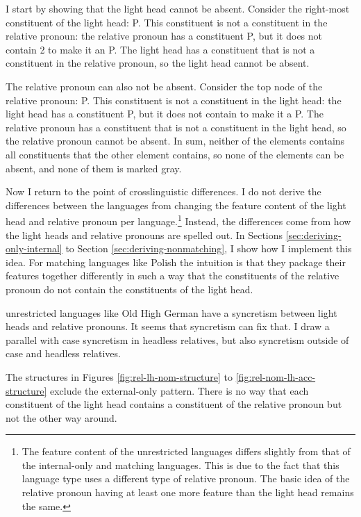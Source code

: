 I start by showing that the light head cannot be absent.
Consider the right-most constituent of the light head: P. This constituent is not a constituent in the relative pronoun: the relative pronoun has a constituent P, but it does not contain 2 to make it an P.
The light head has a constituent that is not a constituent in the relative pronoun, so the light head cannot be absent.

The relative pronoun can also not be absent.
Consider the top node of the relative pronoun: P. This constituent is not a constituent in the light head: the light head has a constituent P, but it does not contain  to make it a P.
The relative pronoun has a constituent that is not a constituent in the light head, so the relative pronoun cannot be absent.
In sum, neither of the elements contains all constituents that the other element contains, so none of the elements can be absent, and none of them is marked gray.

Now I return to the point of crosslinguistic differences.
I do not derive the differences between the languages from changing the feature content of the light head and relative pronoun per language.\footnote{
The feature content of the unrestricted languages differs slightly from that of the internal-only and matching languages. This is due to the fact that this language type uses a different type of relative pronoun. The basic idea of the relative pronoun having at least one more feature than the light head remains the same.
}
Instead, the differences come from how the light heads and relative pronouns are spelled out. In Sections \ref{sec:deriving-only-internal} to Section \ref{sec:deriving-nonmatching}, I show how I implement this idea. For matching languages like Polish the intuition is that they package their features together differently in such a way that the constituents of the relative pronoun do not contain the constituents of the light head.

unrestricted languages like Old High German have a syncretism between light heads and relative pronouns. It seems that syncretism can fix that. I draw a parallel with case syncretism in headless relatives, but also syncretism outside of case and headless relatives.

The structures in Figures \ref{fig:rel-lh-nom-structure} to \ref{fig:rel-nom-lh-acc-structure} exclude the external-only pattern. There is no way that each constituent of the light head contains a constituent of the relative pronoun but not the other way around.

